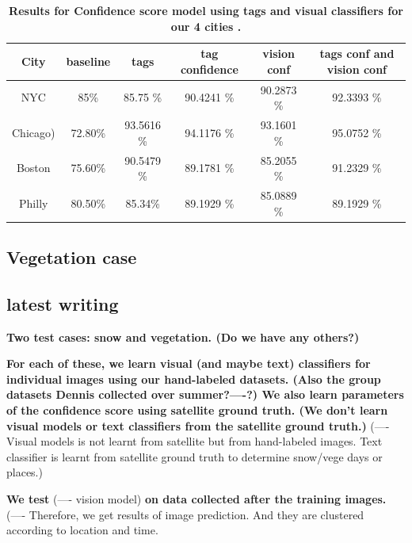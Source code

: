 \begin{table} 
 \caption {\textbf{Results for Confidence score model using tags and visual classifiers for our 4 cities .}}
\label{tab:city_conf_tag_vision} 
\begin{center}
{
\begin{tabular} {|c|c|c|c|c|c|} 
\hline 
City &  baseline & tags  &  tag confidence  &  vision conf & tags conf and vision conf \tabularnewline
\hline 

{NYC} & 85\% & 85.75 \% &90.4241 \%&90.2873 \% &92.3393 \%\tabularnewline
\hline 
{Chicago)} &72.80\% & 93.5616 \% &94.1176 \% &93.1601 \% &95.0752 \%  \tabularnewline
\hline 
{Boston} & 75.60\%& 90.5479 \% &89.1781 \%&85.2055 \% & 91.2329 \% \tabularnewline
\hline 
{Philly} & 80.50\% & 85.34\% & 89.1929 \% &85.0889 \%	 & 89.1929 \%  \tabularnewline
\hline 

\end{tabular}}
\end{center}
\vspace{-12pt}
\end{table}


\subsection{Vegetation case}








\hfill \break
\hfill \break
\subsection*{latest writing}
\hfill \break
\hfill \break

\textbf{
Two test cases: snow and vegetation. (Do we have any others?)
}

\textbf{
For each of these, we learn visual (and maybe text) classifiers for individual images using our hand-labeled datasets. (Also the group datasets Dennis collected over summer?----?) We also learn parameters of the confidence score using satellite ground truth. (We don't learn visual models or text classifiers from the satellite ground truth.)}
(---- Visual models  is not learnt from satellite but from hand-labeled images. Text classifier is learnt from satellite ground truth to determine snow/vege days or places.) 

\textbf{We test }
(---- vision model) 
\textbf{on data collected after the training images.}                                             
(---- Therefore, we get results of image prediction. And they are clustered according to location and time. 

